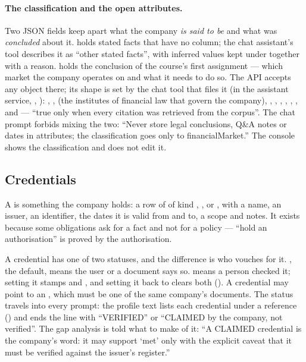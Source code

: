 \paragraph{The classification and the open attributes.} Two JSON fields keep apart what the
company \emph{is said to be} and what was \emph{concluded} about it.  holds
stated facts that have no column; the chat assistant's tool describes it as \enquote{other
stated facts}, with inferred values kept under  together with a
reason.  holds the conclusion of the course's first assignment --- which
market the company operates on and what it needs to do so. The API accepts any object there;
its shape is set by the chat tool that files it (in the assistant service,
, ): ,
,  (the institutes of financial law that govern the
company), , , , ,
, ,  and  ---
\enquote{true only when every citation was retrieved from the corpus}. The chat prompt forbids
mixing the two: \enquote{Never store legal conclusions, Q\&A notes or dates in attributes; the
classification goes only to financialMarket.} The console shows the classification and does
not edit it.

\subsection{Credentials}\label{sec:company:credentials}

A  is something the company holds: a row of  of
kind , ,  or , with a name, an
issuer, an identifier, the dates it is valid from and to, a scope and notes. It exists because
some obligations ask for a fact and not for a policy --- \enquote{hold an authorisation} is
proved by the authorisation.

A credential has one of two statuses, and the difference is who vouches for it.
, the default, means the user or a document says so.  means a
person checked it; setting it stamps  and , and setting it
back to  clears both (). A credential may point to an
, which must be one of the same company's documents. The status
travels into every prompt: the profile text lists each credential under a reference
(\code{[C1]}) and ends the line with \enquote{VERIFIED} or \enquote{CLAIMED by the company,
not verified}. The gap analysis is told what to make of it: \enquote{A CLAIMED credential is
the company's word: it may support \enquote{met} only with the explicit caveat that it must be
verified against the issuer's register.}

